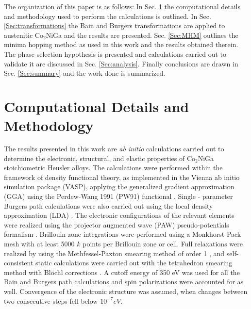 \documentclass[%
preprint,
 amsmath,amssymb,
 aps,
prb,
showkeys,
]{revtex4-1}
\begin{document}
The organization of this paper is as follows: In Sec. \ref{Sec:computational_details}  the computational details and methodology used to perform the calculations is outlined.  In Sec. \ref{Sec:transformations} the Bain and Burgers transformations are applied to austenitic Co$_2$NiGa and the results are presented.  Sec. \ref{Sec:MHM} outlines the minima hopping method as used in this work and the results obtained  therein. The phase selection hypothesis is presented and calculations carried out to validate it are discussed in Sec. \ref{Sec:analysis}. Finally conclusions are drawn in  Sec. \ref{Sec:summary} and the work done is summarized. 
\section{Computational Details and Methodology}
\label{Sec:computational_details}
	The results presented in this work are \textit{ab initio} calculations carried out to determine the electronic, structural, and elastic properties of Co$_2$NiGa stoichiometric Heusler alloys. The calculations were performed within the framework of density functional theory, as implemented in the Vienna ab initio simulation package (VASP)\cite{Kresse1996}, applying the generalized gradient approximation (GGA) using the Perdew-Wang 1991 (PW91) functional \cite{Perdew1992}. Single - parameter Burgers path calculations were also carried out using the local density approximation (LDA) \cite{LDA}. The electronic configurations of the relevant elements were realized using  the projector augmented wave (PAW) pseudo-potentials formalism \cite{blochl1994paw}. Brillouin zone integrations were performed using a Monkhorst-Pack mesh \cite{monkhorst1976} with at least 5000 $k$ points per Brillouin zone or cell. Full relaxations were realized by using the Methfessel-Paxton smearing method of order 1 \cite{methfessel1989}, and self-consistent static calculations were carried out  with the tetrahedron smearing method with Bl\"{o}chl  corrections \cite{blochl1994improved}. A cutoff energy of 350 eV was used for all the  Bain and Burgers path calculations and spin polarizations were accounted for as well. Convergence of the electronic structure was assumed, when changes between two consecutive steps fell below $10^{-7} eV$.
\end{document}
